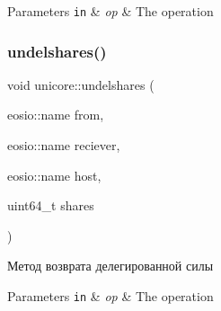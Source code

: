 \begin{DoxyParams}[1]{Parameters}
\mbox{\tt in}  & {\em op} & The operation \\
\hline
\end{DoxyParams}
\mbox{\label{classunicore_a9464479eb5d28b6c7f9956319077b294}} 
\subsubsection{\texorpdfstring{undelshares()}{undelshares()}}
{\footnotesize\ttfamily void unicore\+::undelshares (\begin{DoxyParamCaption}\item[{eosio\+::name}]{from,  }\item[{eosio\+::name}]{reciever,  }\item[{eosio\+::name}]{host,  }\item[{uint64\+\_\+t}]{shares }\end{DoxyParamCaption})}



Метод возврата делегированной силы 


\begin{DoxyParams}[1]{Parameters}
\mbox{\tt in}  & {\em op} & The operation \\
\hline
\end{DoxyParams}
\mbox{\label{classunicore_adabf2b3d106784b146a047e35ceec410}} 
